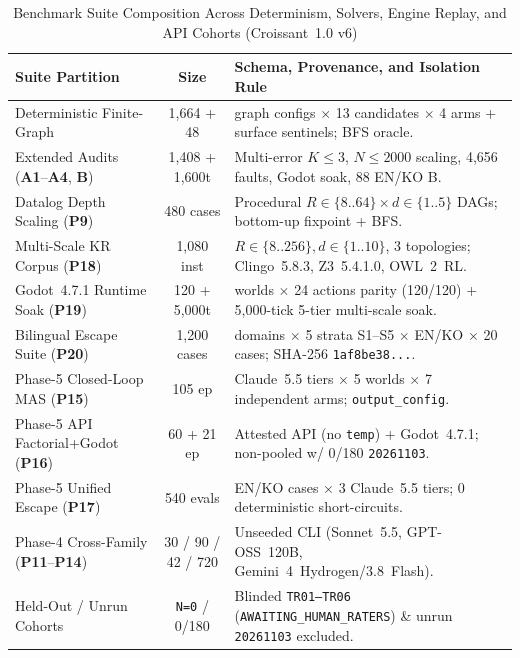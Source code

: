 \begin{table}[!tbp]
\caption{Benchmark Suite Composition Across Determinism, Solvers, Engine Replay, and API Cohorts (Croissant~1.0 v6)}
\label{tab:phase6-db-comp}
\centering
\scriptsize
\setlength{\tabcolsep}{3pt}
\begin{tabularx}{\columnwidth}{@{}>{\raggedright\arraybackslash}p{}c>{\raggedright\arraybackslash}X@{}}
\toprule
\textbf{Suite Partition} & \textbf{Size} & \textbf{Schema, Provenance, and Isolation Rule} \\
\midrule
Deterministic Finite-Graph & 1,664 + 48 & 32 graph configs $\times$ 13 candidates $\times$ 4 arms + surface sentinels; BFS oracle. \\
Extended Audits (\textbf{A1}--\textbf{A4}, \textbf{B}) & 1,408 + 1,600t & Multi-error $K{\le}3$, $N{\le}2000$ scaling, 4,656 faults, Godot soak, 88 EN/KO B. \\
Datalog Depth Scaling (\textbf{P9}) & 480 cases & Procedural $R{\in}\{8..64\}\times d{\in}\{1..5\}$ DAGs; bottom-up fixpoint + BFS. \\
Multi-Scale KR Corpus (\textbf{P18}) & 1,080 inst & $R{\in}\{8..256\}, d{\in}\{1..10\}$, 3 topologies; Clingo~5.8.3, Z3~5.4.1.0, OWL~2~RL. \\
Godot~4.7.1 Runtime Soak (\textbf{P19}) & 120 + 5,000t & 5 worlds $\times$ 24 actions parity (120/120) + 5,000-tick 5-tier multi-scale soak. \\
Bilingual Escape Suite (\textbf{P20}) & 1,200 cases & 6 domains $\times$ 5 strata S1--S5 $\times$ EN/KO $\times$ 20 cases; SHA-256 \texttt{1af8be38...}. \\
Phase-5 Closed-Loop MAS (\textbf{P15}) & 105 ep & 3 Claude~5.5 tiers $\times$ 5 worlds $\times$ 7 independent arms; \texttt{output\_config}. \\
Phase-5 API Factorial+Godot (\textbf{P16}) & 60 + 21 ep & Attested API (no \texttt{temp}) + Godot~4.7.1; non-pooled w/ 0/180 \texttt{20261103}. \\
Phase-5 Unified Escape (\textbf{P17}) & 540 evals & 180 EN/KO cases $\times$ 3 Claude~5.5 tiers; 0 deterministic short-circuits. \\
Phase-4 Cross-Family (\textbf{P11}--\textbf{P14}) & 30 / 90 / 42 / 720 & Unseeded CLI (Sonnet~5.5, GPT-OSS~120B, Gemini~4~Hydrogen/3.8~Flash). \\
Held-Out / Unrun Cohorts & \texttt{N=0} / 0/180 & Blinded \texttt{TR01--TR06} (\texttt{AWAITING\_HUMAN\_RATERS}) \& unrun \texttt{20261103} excluded. \\
\bottomrule
\end{tabularx}
\end{table}

